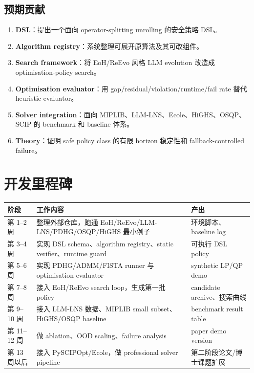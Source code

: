 \documentclass[12pt,a4paper]{ctexart}
\begin{document}
\subsection{预期贡献}
\begin{enumerate}
    \item \textbf{DSL}：提出一个面向 operator-splitting unrolling 的安全策略 DSL。
    \item \textbf{Algorithm registry}：系统整理可展开原算法及其可改组件。
    \item \textbf{Search framework}：将 EoH/ReEvo 风格 LLM evolution 改造成 optimisation-policy search。
    \item \textbf{Optimisation evaluator}：用 gap/residual/violation/runtime/fail rate 替代 heuristic evaluator。
    \item \textbf{Solver integration}：面向 MIPLIB、LLM-LNS、Ecole、HiGHS、OSQP、SCIP 的 benchmark 和 baseline 体系。
    \item \textbf{Theory}：证明 safe policy class 的有限 horizon 稳定性和 fallback-controlled failure。
\end{enumerate}

\section{开发里程碑}

\begin{longtable}{p{}p{}p{}}
\toprule
阶段 & 工作内容 & 产出 \\
\midrule
第 1--2 周 & 整理外部仓库，跑通 EoH/ReEvo/LLM-LNS/PDHG/OSQP/HiGHS 最小例子 & 环境脚本、baseline log \\
第 3--4 周 & 实现 DSL schema、algorithm registry、static verifier、runtime guard & 可执行 DSL policy \\
第 5--6 周 & 实现 PDHG/ADMM/FISTA runner 与 optimisation evaluator & synthetic LP/QP demo \\
第 7--8 周 & 接入 EoH/ReEvo search loop，生成第一批 policy & candidate archive、搜索曲线 \\
第 9--10 周 & 接入 LLM-LNS 数据、MIPLIB small subset、HiGHS/OSQP baseline & benchmark result table \\
第 11--12 周 & 做 ablation、OOD scaling、failure analysis & paper demo version \\
第 13 周以后 & 接入 PySCIPOpt/Ecole，做 professional solver pipeline & 第二阶段论文/博士课题扩展 \\
\bottomrule
\end{longtable}
\end{document}
